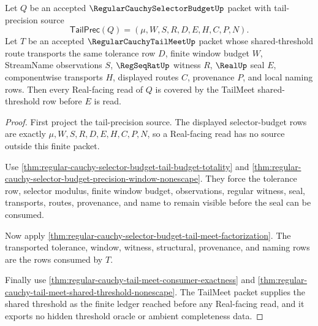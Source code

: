 \begin{theorem}
\label{thm:regular-cauchy-selector-budget-tail-meet-threshold-coverage}
Let $Q$ be an accepted $\RegularCauchySelectorBudgetUp$ packet with tail-precision source
$$
\mathsf{TailPrec}(Q)=(\mu,W,S,R,D,E,H,C,P,N).
$$
Let $T$ be an accepted $\RegularCauchyTailMeetUp$ packet whose shared-threshold route transports the same tolerance row $D$, finite window budget $W$, StreamName observations $S$, $\RegSeqRatUp$ witness $R$, $\RealUp$ seal $E$, componentwise transports $H$, displayed routes $C$, provenance $P$, and local naming rows. Then every Real-facing read of $Q$ is covered by the TailMeet shared-threshold row before $E$ is read.
\end{theorem}
\begin{proof}
First project the tail-precision source. The displayed selector-budget rows are exactly $\mu,W,S,R,D,E,H,C,P,N$, so a Real-facing read has no source outside this finite packet.

Use \autoref{thm:regular-cauchy-selector-budget-tail-budget-totality} and \autoref{thm:regular-cauchy-selector-budget-precision-window-nonescape}. They force the tolerance row, selector modulus, finite window budget, observations, regular witness, seal, transports, routes, provenance, and name to remain visible before the seal can be consumed.

Now apply \autoref{thm:regular-cauchy-selector-budget-tail-meet-factorization}. The transported tolerance, window, witness, structural, provenance, and naming rows are the rows consumed by $T$.

Finally use \autoref{thm:regular-cauchy-tail-meet-consumer-exactness} and \autoref{thm:regular-cauchy-tail-meet-shared-threshold-nonescape}. The TailMeet packet supplies the shared threshold as the finite ledger reached before any Real-facing read, and it exports no hidden threshold oracle or ambient completeness data.
\end{proof}

